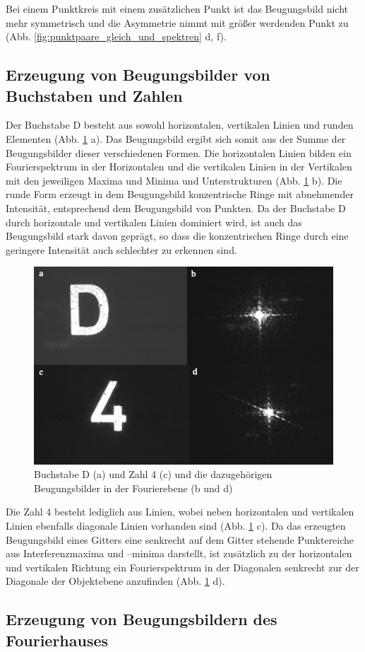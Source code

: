 Bei einem Punktkreis mit einem zusätzlichen Punkt ist das Beugungsbild nicht mehr symmetrisch und die Asymmetrie nimmt mit größer werdenden Punkt zu (Abb. \ref{fig:punktpaare_gleich_und_spektren} d, f).


\subsection{Erzeugung von Beugungsbilder von Buchstaben und Zahlen}

Der Buchstabe D besteht aus sowohl horizontalen, vertikalen Linien und runden Elementen (Abb. \ref{fig:ziffern_mit_spektren} a). Das Beugungsbild ergibt sich somit aus der Summe der Beugungsbilder dieser verschiedenen Formen. Die horizontalen Linien bilden ein Fourierspektrum in der Horizontalen und die vertikalen Linien in der Vertikalen mit den jeweiligen Maxima und Minima und Unterstrukturen (Abb. \ref{fig:ziffern_mit_spektren} b). Die runde Form erzeugt in dem Beugungsbild konzentrische Ringe mit abnehmender Intensität, entsprechend dem Beugungsbild von Punkten. Da der Buchstabe D durch horizontale und vertikalen Linien dominiert wird, ist auch das Beugungsbild stark davon geprägt, so dass die konzentrischen Ringe durch eine geringere Intensität auch schlechter zu erkennen sind.

\begin{figure}[h]
	\centering
	\includegraphics[width=0.10\linewidth]{Regina/abb19}
	\caption[Ziffern mit Fourierspektren]{Buchstabe D (a) und Zahl 4 (c) und die dazugehörigen Beugungsbilder in der Fourierebene (b und d)}
	\label{fig:ziffern_mit_spektren}
\end{figure}

Die Zahl 4 besteht lediglich aus Linien, wobei neben horizontalen und vertikalen Linien ebenfalls diagonale Linien vorhanden sind (Abb. \ref{fig:ziffern_mit_spektren} c). Da das erzeugten Beugungsbild eines Gitters eine senkrecht auf dem Gitter stehende Punktereiche aus Interferenzmaxima und –minima darstellt, ist zusätzlich zu der horizontalen und vertikalen Richtung ein Fourierspektrum in der Diagonalen senkrecht zur der Diagonale der Objektebene anzufinden
(Abb. \ref{fig:ziffern_mit_spektren} d).

\subsection{Erzeugung von Beugungsbildern des Fourierhauses}

